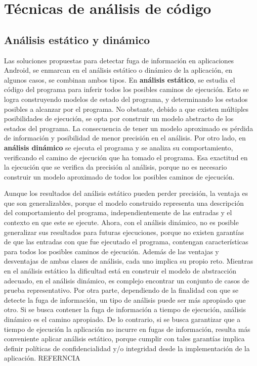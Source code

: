 \section{Técnicas de análisis de código}
\label{sec:contexto}
\subsection{Análisis estático y dinámico}

Las soluciones propuestas para detectar fuga de información en aplicaciones
Android, se enmarcan en el análisis estático o dinámico de la aplicación, en
algunos casos, se combinan ambos tipos.\newline 
En \textbf{análisis estático}\cite{Static-dynamic}, se estudia el código del
programa para inferir todos los posibles caminos de ejecución. Esto se logra
construyendo modelos de estado del programa, y determinando los estados posibles
a alcanzar por el programa.
No obstante, debido a que existen múltiples posibilidades de ejecución, se opta
por construir un modelo abstracto de los estados del programa. La consecuencia
de tener un modelo aproximado es pérdida de información y posibilidad de menor
precisión en el análisis.\newline 
Por otro lado, en \textbf{análisis dinámico} se ejecuta el programa y se analiza
su comportamiento, verificando el camino de ejecución que ha tomado el programa.
Esa exactitud en la ejecución que se verifica da precisión al análisis, porque
no es necesario construir un modelo aproximado de todos los posibles caminos de
ejecución.

Aunque los resultados del análisis estático pueden perder precisión, la ventaja
es que son generalizables, porque el modelo construido representa una
descripción del comportamiento del programa, independientemente de las entradas
y el contexto en que este se ejecute. Ahora, con el análisis dinámico, no es
posible generalizar sus resultados para futuras ejecuciones, porque no
existen garantías de que las entradas con que fue ejecutado el programa,
contengan características para todos los posibles caminos de ejecución.\newline 
Además de las ventajas y desventajas de ambas clases de análisis, cada uno
implica su propio reto. Mientras en el análisis estático la dificultad está
en construir el modelo de abstracción adecuado, en el análisis dinámico, es
complejo encontrar un conjunto de casos de prueba representativo.\newline
Por otra parte, dependiendo de la finalidad con que se detecte la fuga de
información, un tipo de análisis puede ser más apropiado que otro. Si se busca
contener la fuga de información a tiempo de ejecución, análisis dinámico es el
camino apropiado. 
De lo contrario, si se busca garantizar que a tiempo de
ejecución la aplicación no incurre en fugas de información, resulta más
conveniente aplicar análisis estático, porque cumplir con tales garantías
implica definir políticas de confidencialidad y/o integridad desde la
implementación de la aplicación. REFERNCIA


